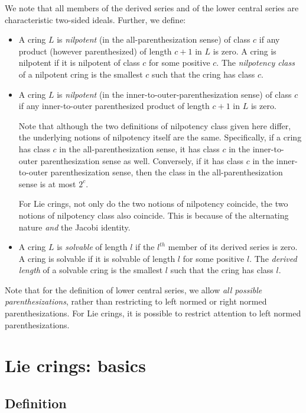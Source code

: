 \documentclass[10pt]{amsart}
\begin{document}
We note that all members of the derived series and of the lower
central series are characteristic two-sided ideals. Further, we define:

\begin{itemize}
\item A cring $L$ is {\em nilpotent} (in the all-parenthesization
  sense) of class $c$ if any product (however parenthesized) of length
  $c + 1$ in $L$ is zero. A cring is nilpotent if it is nilpotent of
  class $c$ for some positive $c$. The {\em nilpotency class} of a
  nilpotent cring is the smallest $c$ such that the cring has class
  $c$.
\item A cring $L$ is {\em nilpotent} (in the inner-to-outer-parenthesization
  sense) of class $c$ if any inner-to-outer parenthesized product of length
  $c + 1$ in $L$ is zero. 

  Note that although the two definitions of nilpotency class given
  here differ, the underlying notions of nilpotency itself are the
  same. Specifically, if a cring has class $c$ in the
  all-parenthesization sense, it has class $c$ in the inner-to-outer
  parenthesization sense as well. Conversely, if it has class $c$ in
  the inner-to-outer parenthesization sense, then the class in the
  all-parenthesization sense is at most $2^c$.

  For Lie crings, not only do the two notions of nilpotency coincide,
  the two notions of nilpotency class also coincide. This is because
  of the alternating nature {\em and} the Jacobi identity.
\item A cring $L$ is {\em solvable} of length $l$ if the $l^{th}$
  member of its derived series is zero. A cring is solvable if it is
  solvable of length $l$ for some positive $l$. The {\em derived
  length} of a solvable cring is the smallest $l$ such that the cring
  has class $l$.
\end{itemize}

Note that for the definition of lower central series, we allow {\em
all possible parenthesizations}, rather than restricting to left
normed or right normed parenthesizations. For Lie crings, it is
possible to restrict attention to left normed parenthesizations.

\section{Lie crings: basics}

\subsection{Definition}
\end{document}

